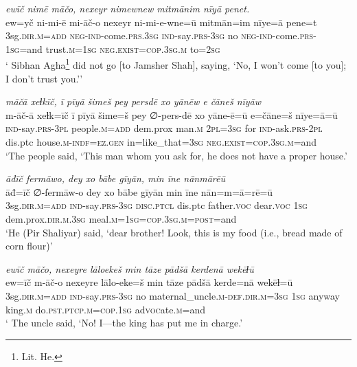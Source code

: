 \ea \label{DP.40}
\textit{ewīč nimē māčo, nexeyr nimewnew mitmānim nīyā penet.} \\ 
\gll ew=yč ni-mi-ē mi-āč-o nexeyr ni-mi-e-wne=ū mitmān=im nīye=ā pene=t \\ 
 3sg\textsc{.dir}\textsc{.m}\textsc{=add} \textsc{neg-}\textsc{ind-}come\textsc{.prs}\textsc{.3sg} \textsc{ind-}say\textsc{.prs}\textsc{-3sg} no \textsc{neg-}\textsc{ind-}come\textsc{.prs}\textsc{-1sg}=and trust\textsc{.m}\textsc{=1sg} \textsc{\textsc{neg.}exist}\textsc{=cop}\textsc{.3sg}\textsc{.m} to\textsc{=\textsc{2sg}} \\ 
\glt ` Sibhan Agha\footnote{Lit. He.} did not go [to Jamsher Shah], saying, ‘No, I won’t come [to you]; I don’t trust you.’'
\z 
 
\ea \label{ZP.86}
\textit{māčā xeɫkīč, ī pīyā šimeš pey persdē xo yānēw e čāneš nīyāw} \\ 
\gll m-āč-ā xeɫk=īč ī pīyā šime=š pey ∅-pers-dē xo yāne-ē=ū e=čāne=š nīye=ā=ū \\ 
 \textsc{ind-}say\textsc{.prs}\textsc{-3pl} people\textsc{.m}\textsc{=add} dem.prox man\textsc{.m} \textsc{2pl}\textsc{=3sg} for \textsc{ind-}ask\textsc{.prs}-\textsc{2pl} dis.ptc house\textsc{.m}\textsc{-indf}\textsc{\textsc{=ez.gen}} in=like\_that\textsc{=3sg} \textsc{\textsc{neg.}exist}\textsc{=cop}\textsc{.3sg}\textsc{.m}=and \\ 
\glt `The people said, ‘This man whom you ask for, he does not have a proper house.'
\z 
 
\ea \label{ZP.101}
\textit{āđīč fermāwo, dey xo bābe gīyān, min īne nānmārēū} \\ 
\gll āđ=īč ∅-fermāw-o dey xo bābe gīyān min īne nān=m=ā=rē=ū \\ 
 3sg\textsc{.dir}\textsc{.m}\textsc{=add} \textsc{ind-}say\textsc{.prs}\textsc{-3sg} \textsc{disc.ptcl} dis.ptc father.\textsc{voc} dear.\textsc{voc} \textsc{1sg} dem.prox\textsc{.dir}\textsc{.m}\textsc{.3sg} meal\textsc{.m}\textsc{=\textsc{1sg}}\textsc{=cop}\textsc{.3sg}\textsc{.m}\textsc{=\textsc{post}}=and \\ 
\glt `He (Pir Shaliyar) said, ‘dear brother! Look, this is my food (i.e., bread made of corn flour)'
\z 
 
\ea \label{ZP.107}
\textit{ewīč māčo, nexeyre lāloekeš min tāze pādšā kerdenā wekēɫū} \\ 
\gll ew=īč m-āč-o nexeyre lālo-eke=š min tāze pādšā kerde=nā wekēɫ=ū \\ 
 3sg\textsc{.dir}\textsc{.m}\textsc{=add} \textsc{ind-}say\textsc{.prs}\textsc{-3sg} no maternal\_uncle\textsc{.m}\textsc{-def}\textsc{.dir}\textsc{.m}\textsc{=3sg} \textsc{1sg} anyway king\textsc{.m} do\textsc{.pst}\textsc{.ptcp}\textsc{.m}\textsc{=cop}\textsc{.\textsc{1sg}} ad\textsc{voc}ate\textsc{.m}=and \\ 
\glt ` The uncle said, ‘No! I—the king has put me in charge.'
\z 
 
